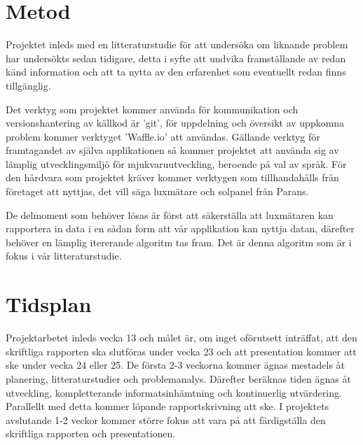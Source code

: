 \documentclass[a4paper, 12pt]{article}
\begin{document}

\section{Metod}
\label{sec:metod} %
    Projektet inleds med en litteraturstudie för att undersöka om liknande problem har undersökts sedan tidigare, detta i syfte att undvika framställande av redan känd information och att ta nytta av den erfarenhet som eventuellt redan finns tillgänglig. \bigskip

    Det verktyg som projektet kommer använda för kommunikation och versionshantering av källkod är 'git', för uppdelning och översikt av uppkomna problem kommer verktyget 'Waffle.io' att användas. Gällande verktyg för framtagandet av själva applikationen så kommer projektet att an\-vända sig av lämplig utvecklingsmiljö för mjukvaruutveckling, beroende på val av språk. För den hårdvara som projektet kräver kommer verktygen som tillhandahålls från företaget att nyttjas, det vill säga luxmätare och solpanel från Parans. \bigskip 

    De delmoment som behöver lösas är först att säkerställa att luxmätaren kan rapportera in data i en sådan form att vår applikation kan nyttja datan, därefter behöver en lämplig itererande algoritm tas fram. Det är denna algoritm som är i fokus i vår litteraturstudie.

\section{Tidsplan}
\label{sec:tidsplan} %
    Projektarbetet inleds vecka 13 och målet är, om inget oförutsett inträffat, att den skriftliga rapporten ska slutföras under vecka 23 och att presentation kommer att ske under vecka 24 eller 25. De första 2-3 veckorna kommer ägnas mestadels åt planering, litteraturstudier och problemanalys. Därefter beräknas tiden ägnas åt utveckling, kompletterande informatsinhämtning och kontinuerlig utvärdering. Parallellt med detta kommer löpande rapportskrivning att ske. I projektets avslutande 1-2 veckor kommer större fokus att vara på att färdigställa den skriftliga rapporten och presentationen. \bigskip
\end{document}
